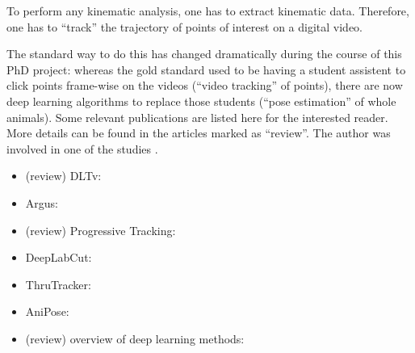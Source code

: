 To perform any kinematic analysis, one has to extract kinematic data.
Therefore, one has to ``track'' the trajectory of points of interest on a digital video.

The standard way to do this has changed dramatically during the course of this PhD project:
whereas the gold standard used to be having a student assistent to click points frame-wise on the videos (``video tracking'' of points), there are now deep learning algorithms to replace those students (``pose estimation'' of whole animals).
Some relevant publications are listed here for the interested reader.
More details can be found in the articles marked as ``review''.
The author was involved in one of the studies \citep{MMielke2020}.

\begin{itemize}
\item (review) DLTv: \citet{Hedrick2008}
\item Argus: \citet{Jackson2016}
\item (review) Progressive Tracking: \citet{MMielke2020}
\item DeepLabCut: \citet{Mathis2018,Mathis2020}
\item ThruTracker: \citet{Corcoran2021}
\item AniPose: \citet{Karashchuk2021}
\item (review) overview of deep learning methods: \citet{Cronin2021}
\end{itemize}
